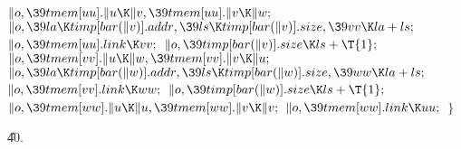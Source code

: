 ${}\|o,\39\\{tmem}[\\{uu}].\|u\K\|v,\39\\{tmem}[\\{uu}].\|v\K\|w;{}$\6
${}\|o,\39\\{la}\K\\{timp}[\\{bar}(\|v)].\\{addr},\39\\{ls}\K\\{timp}[\\{bar}(%
\|v)].\\{size},\39\\{vv}\K\\{la}+\\{ls};{}$\6
${}\|o,\39\\{tmem}[\\{uu}].\\{link}\K\\{vv};{}$\6
${}\|o,\39\\{timp}[\\{bar}(\|v)].\\{size}\K\\{ls}+\T{1};{}$\6
${}\|o,\39\\{tmem}[\\{vv}].\|u\K\|w,\39\\{tmem}[\\{vv}].\|v\K\|u;{}$\6
${}\|o,\39\\{la}\K\\{timp}[\\{bar}(\|w)].\\{addr},\39\\{ls}\K\\{timp}[\\{bar}(%
\|w)].\\{size},\39\\{ww}\K\\{la}+\\{ls};{}$\6
${}\|o,\39\\{tmem}[\\{vv}].\\{link}\K\\{ww};{}$\6
${}\|o,\39\\{timp}[\\{bar}(\|w)].\\{size}\K\\{ls}+\T{1};{}$\6
${}\|o,\39\\{tmem}[\\{ww}].\|u\K\|u,\39\\{tmem}[\\{ww}].\|v\K\|v;{}$\6
${}\|o,\39\\{tmem}[\\{ww}].\\{link}\K\\{uu};{}$\6
\4${}\}{}$\2\par
\U40.\fi

